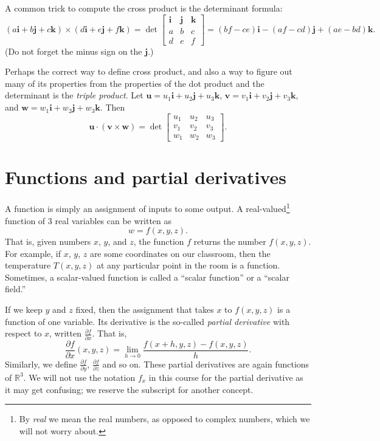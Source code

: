 \documentclass[12pt]{article}
\newcommand{\R}{{\mathbb{R}}}
\newcommand{\veci}{\mathbf{i}}
\newcommand{\vecj}{\mathbf{j}}
\newcommand{\veck}{\mathbf{k}}
\begin{document}
A common trick to compute the cross product
is the determinant formula:
\[
(a \veci + b \vecj + c \veck ) \times 
(d \veci + e \vecj + f \veck ) =
\det
\begin{bmatrix}
\veci & \vecj & \veck \\
a & b & c \\
d & e & f
\end{bmatrix}
=
(bf-ce) \veci -
(af-cd) \vecj +
(ae-bd) \veck .
\]
(Do not forget the minus sign on the $\vecj$.)

Perhaps the correct way to define cross product,
and also a way to figure out many of its properties from
the properties of the dot product and
the determinant is the \emph{triple product}.
Let $\mathbf{u} = u_1 \veci + u_2 \vecj + u_3 \veck$,
$\mathbf{v} = v_1 \veci + v_2 \vecj + v_3 \veck$, and
$\mathbf{w} = w_1 \veci + w_2 \vecj + w_3 \veck$.  Then
\[
\mathbf{u} \cdot ( \mathbf{v} \times \mathbf{w} )
=
\det
\begin{bmatrix}
u_1 & u_2 & u_3 \\
v_1 & v_2 & v_3 \\
w_1 & w_2 & w_3
\end{bmatrix} .
\]


\section{Functions and partial derivatives}

A function is simply an assignment of inputs to some output.
A real-valued\footnote{By \emph{real} we mean the real numbers,
as opposed to complex numbers, which we will not worry about.}
function of 3 real variables can be written as
\[
w = f(x,y,z) .
\]
That is, given numbers $x$, $y$, and $z$, the function $f$ returns the number $f(x,y,z)$.
For example, if $x$, $y$, $z$ are some coordinates on our classroom,
then the temperature $T(x,y,z)$ at any particular point in the room
is a function.  Sometimes, a scalar-valued function is called a
``scalar function'' or a ``scalar field.''

If we keep $y$ and $z$ fixed, then the assignment that takes $x$ to $f(x,y,z)$ is a
function of one variable.
Its derivative is the so-called \emph{partial derivative} with respect to $x$,
written $\frac{\partial f}{\partial x}$.  That is,
\[
\frac{\partial f}{\partial x}(x,y,z) =
\lim_{h\to 0} \frac{f(x+h,y,z)-f(x,y,z)}{h} .
\]
Similarly, we define
$\frac{\partial f}{\partial y}$,
$\frac{\partial f}{\partial z}$ and so on.  These partial derivatives are again
functions of $\R^3$.
We will not use the notation $f_x$ in this
course for the partial derivative as
it may get confusing;
we reserve the subscript for another concept.
\end{document}
